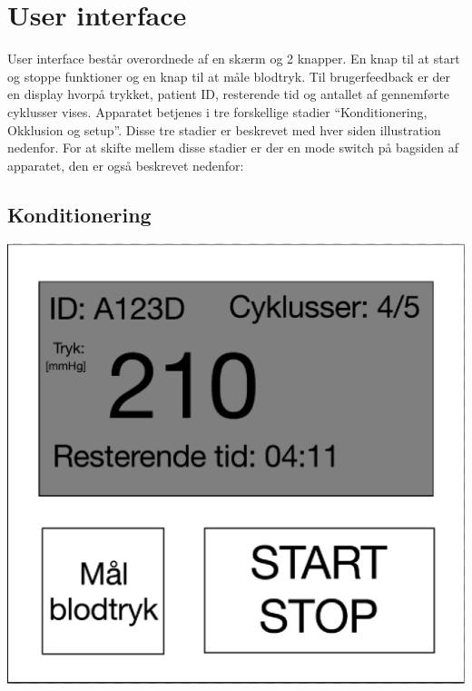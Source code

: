 \chapter{User interface}
User interface består overordnede af en skærm og 2 knapper. En knap til at start og stoppe funktioner og en knap til at måle blodtryk. Til brugerfeedback er der en display hvorpå trykket, patient ID, resterende tid og antallet af gennemførte cyklusser vises. Apparatet betjenes i tre forskellige stadier “Konditionering, Okklusion og setup”. Disse tre stadier er beskrevet med hver siden illustration nedenfor. For at skifte mellem disse stadier er der en mode switch på bagsiden af apparatet, den er også beskrevet nedenfor: 

\section{Konditionering}
\includegraphics[width=\textwidth]{Illustrationer/KonditioneringGUI}
